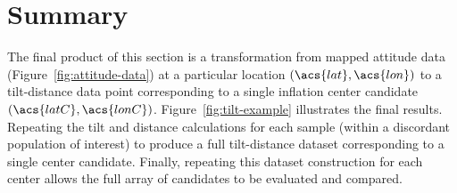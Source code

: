 





\section{Summary}

The final product of this section is a transformation from mapped attitude data (Figure~\ref{fig:attitude-data}) at a particular location $(\acs{lat}, \acs{lon})$ to a tilt-distance data point corresponding to a single inflation center candidate $(\acs{latC}, \acs{lonC})$. Figure~\ref{fig:tilt-example} illustrates the final results. Repeating the tilt and distance calculations for each sample (within a discordant population of interest) to produce a full tilt-distance dataset corresponding to a single center candidate. Finally, repeating this dataset construction for each center allows the full array of candidates to be evaluated and compared.